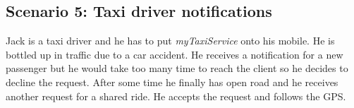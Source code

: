 \subsection{Scenario 5: Taxi driver notifications}
Jack is a taxi driver and he has to put \textit{myTaxiService} onto his mobile. He is bottled up in traffic due to a car accident. He receives a notification for a new passenger but he would take too many time to reach the client so he decides to decline the request. After some time he finally has open road and he receives another request for a shared ride. He accepts the request and follows the GPS.